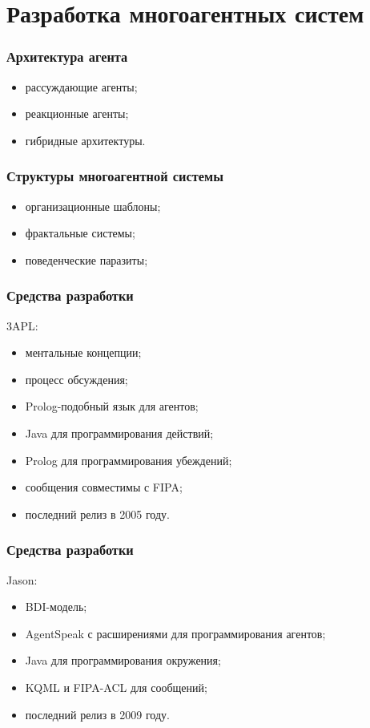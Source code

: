 \documentclass{beamer}
\begin{document}
\section{Разработка многоагентных систем}

\begin{frame}
  \frametitle{Архитектура агента}
  \begin{itemize}
    \item рассуждающие агенты;
    \item реакционные агенты;
    \item гибридные архитектуры.
  \end{itemize}
\end{frame}

\begin{frame}
  \frametitle{Структуры многоагентной системы}
  \begin{itemize}
    \item организационные шаблоны;
    \item фрактальные системы;
    \item поведенческие паразиты;
  \end{itemize}
\end{frame}

\begin{frame}
  \frametitle{Средства разработки}
  3APL:
  \begin{itemize}
    \item ментальные концепции;
    \item процесс обсуждения;
    \item Prolog-подобный язык для агентов;
    \item Java для программирования действий;
    \item Prolog для программирования убеждений;
    \item сообщения совместимы с FIPA;
    \item последний релиз в 2005 году.
  \end{itemize}
\end{frame}

\begin{frame}
  \frametitle{Средства разработки}
  Jason:
  \begin{itemize}
    \item BDI-модель;
    \item AgentSpeak с расширениями для программирования агентов;
    \item Java для программирования окружения;
    \item KQML и FIPA-ACL для сообщений;
    \item последний релиз в 2009 году.
  \end{itemize}
\end{frame}
\end{document}
